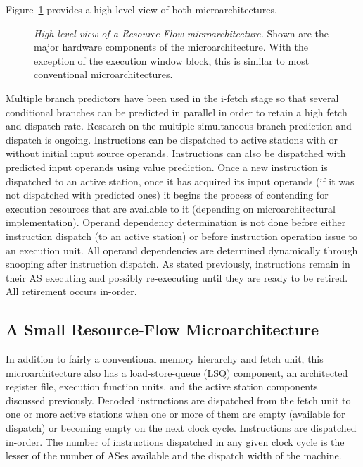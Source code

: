 \documentclass{book}
\begin{document}
Figure~\ref{fig:high} provides a high-level view of 
both microarchitectures.
%
\begin{figure}
\centerline{}
\caption[High-level view of a Resource Flow microarchitecture]
{{\em High-level view of a Resource Flow microarchitecture.} 
Shown are the major hardware components of the microarchitecture.
With the exception of the 
execution window block, this is similar to most conventional
microarchitectures.}
\label{fig:high}
\end{figure}
%
Multiple branch predictors have been used in the i-fetch stage
so that several conditional branches can be predicted in parallel
in order to retain a high fetch and dispatch rate.
Research on the multiple simultaneous branch prediction and
dispatch is ongoing.
Instructions can be dispatched to
active stations with or without initial input source operands.
Instructions can also be dispatched with predicted input operands
using value prediction.
Once a new instruction is dispatched to an active station,
once it has acquired its input operands (if it was not dispatched
with predicted ones)
it begins the process of contending for
execution resources that are available to it (depending on
microarchitectural implementation).
Operand dependency determination is not done before
either instruction dispatch (to an active station) or
before instruction operation issue to an execution unit.
All operand dependencies are determined dynamically through
snooping after instruction dispatch.
As stated previously, instructions remain in their AS executing
and possibly re-executing until they are ready to be retired.
All retirement occurs in-order.
%
%
\subsection{A Small Resource-Flow Microarchitecture}
%
In addition to fairly a conventional memory hierarchy and
fetch unit, this microarchitecture also has a
load-store-queue (LSQ) component, an architected register file,
execution function units.
and the active station components discussed previously.
Decoded instructions are dispatched from the 
fetch unit to one or more active stations
when one or more of them are empty (available for dispatch) or 
becoming empty on the next clock cycle.  
Instructions are dispatched in-order.
The number of instructions dispatched in any 
given clock cycle is
the lesser of the number of ASes available and the
dispatch width of the machine.
\end{document}
